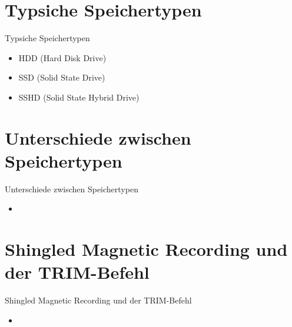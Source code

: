 \documentclass{beamer}
\begin{document}
\section{Typsiche Speichertypen}
\begin{frame}{Typsiche Speichertypen}
	\begin{itemize}
		\item HDD (Hard Disk Drive)
		\item SSD (Solid State Drive)
		\item SSHD (Solid State Hybrid Drive)
	\end{itemize}
\end{frame}

\section{Unterschiede zwischen Speichertypen}
\begin{frame}{Unterschiede zwischen Speichertypen}
	\begin{itemize}
		\item 
	\end{itemize}
\end{frame}

\section{Shingled Magnetic Recording und der TRIM-Befehl}
\begin{frame}{Shingled Magnetic Recording und der TRIM-Befehl}
	\begin{itemize}
		\item 
	\end{itemize}
\end{frame}

\end{document}
